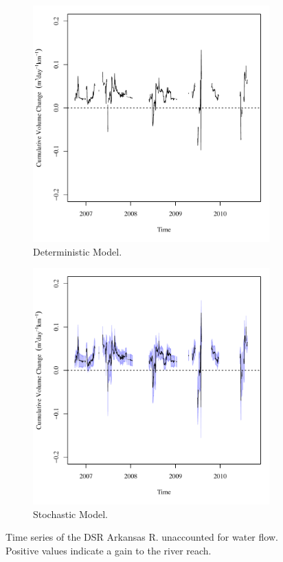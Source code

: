 \begin{linenumbers}
\begin{figure}[htbp]
\centering
	\begin{subfigure}{0.5\textwidth}
		\centering
		\includegraphics[width=0.9\linewidth]{"Figures/Results_DDSR/Balance Water"}
		\caption{Deterministic Model.}
		\label{sub:DSRWaterD}
	\end{subfigure}%
	\begin{subfigure}{0.5\textwidth}
		\centering
		\includegraphics[width=0.9\linewidth]{"Figures/Results_DSR/Balance Water"}
		\caption{Stochastic Model.}
		\label{sub:DSRWaterS}
	\end{subfigure}
	\caption[Time series of the DSR Arkansas R. unaccounted for water flow.]{Time series of the DSR Arkansas R. unaccounted for water flow.  Positive values indicate a gain to the river reach.}
	\label{fig:DSRWater}
\end{figure}


\end{linenumbers}
